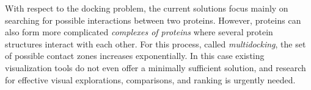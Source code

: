 \documentclass[11pt,a4paper,titlepage,oneside,onecolumn]{article}
\begin{document}

With respect to the docking problem, the current solutions focus mainly on searching for possible interactions between two proteins.
However, proteins can also form more complicated \textit{complexes of proteins} where several protein structures interact with each other.
For this process, called \textit{multidocking}, the set of possible contact zones increases exponentially. 
In this case existing visualization tools do not even offer a minimally sufficient solution, and research for effective visual explorations, comparisons, and ranking is urgently needed.

\end{document}
